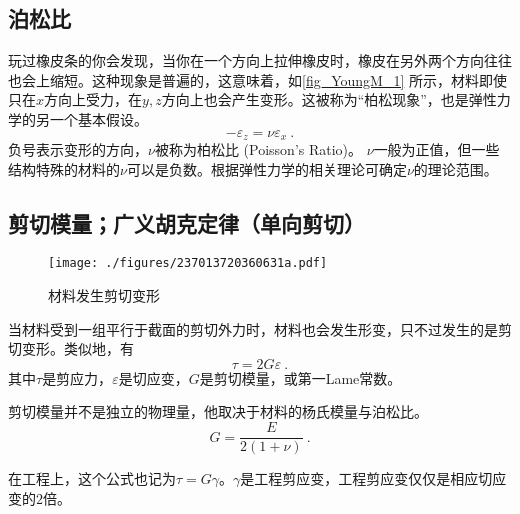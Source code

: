 \subsection{泊松比}
玩过橡皮条的你会发现，当你在一个方向上拉伸橡皮时，橡皮在另外两个方向往往也会上缩短。这种现象是普遍的，这意味着，如\autoref{fig_YoungM_1} 所示，材料即使只在$x$方向上受力，在$y,z$方向上也会产生变形。这被称为“柏松现象”，也是弹性力学的另一个基本假设。
\begin{equation}
-\varepsilon_z= \nu \varepsilon_x~.
\end{equation}
负号表示变形的方向，$\nu$被称为柏松比 (Poisson's Ratio)。 $\nu$一般为正值，但一些结构特殊的材料的$\nu$可以是负数。根据弹性力学的相关理论可确定$\nu$的理论范围。%

\subsection{剪切模量；广义胡克定律（单向剪切）}
\begin{figure}[ht]
\centering
\texttt{[image: ./figures/237013720360631a.pdf]}
\caption{材料发生剪切变形} \label{fig_YoungM_2}
\end{figure}
当材料受到一组平行于截面的剪切外力时，材料也会发生形变，只不过发生的是剪切变形。类似地，有
\begin{equation}
\tau=2G\varepsilon~.
\end{equation}
其中$\tau$是剪应力，$\varepsilon$是切应变，$G$是剪切模量，或第一Lame常数。

剪切模量并不是独立的物理量，他取决于材料的杨氏模量与泊松比。
\begin{equation}
G = \frac{E}{2(1+\nu)}~.
\end{equation}

在工程上，这个公式也记为$\tau=G\gamma$。$\gamma$是工程剪应变，工程剪应变仅仅是相应切应变的$2$倍。
